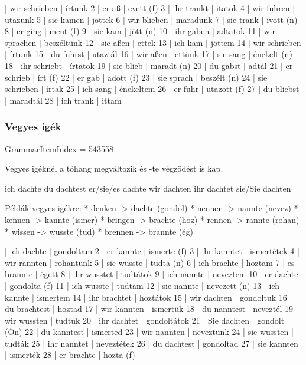 \documentclass{article}
\newenvironment{desc}{\verbatim}{\endverbatim}
\newenvironment{exmp}{\verbatim}{\endverbatim}
\begin{document}
\begin{exmp}
1 | wir schrieben | írtunk
2 | er aß | evett (f)
3 | ihr trankt | itatok
4 | wir fuhren | utazunk
5 | sie kamen | jöttek
6 | wir blieben | maradunk
7 | sie trank | ivott (n)
8 | er ging | ment (f)
9 | sie kam | jött (n)
10 | ihr gaben | adtatok
11 | wir sprachen | beszéltünk
12 | sie aßen | ettek
13 | ich kam | jöttem
14 | wir schrieben | írtunk
15 | du fuhrst | utaztál
16 | wir aßen | ettünk
17 | sie sang | énekelt (n)
18 | ihr schriebt | írtatok
19 | sie blieb | maradt (n)
20 | du gabst | adtál
21 | er schrieb | írt (f)
22 | er gab | adott (f)
23 | sie sprach | beszélt (n)
24 | sie schrieben | írtak
25 | ich sang | énekeltem
26 | er fuhr | utazott (f)
27 | du bliebst | maradtál
28 | ich trank | ittam
\end{exmp}

\subsubsection{Vegyes igék}

GrammarItemIndex = 543558

\begin{desc}
Vegyes igéknél a tőhang megváltozik és -te végződést is kap.

ich dachte
du dachtest
er/sie/es dachte
wir dachten
ihr dachtet
sie/Sie dachten

Példák vegyes igékre:
* denken -> dachte (gondol)
* nennen -> nannte (nevez)
* kennen -> kannte (ismer)
* bringen -> brachte (hoz)
* rennen -> rannte (rohan)
* wissen -> wusste (tud)
* brennen -> brannte (ég)
\end{desc}

\begin{exmp}
1 | ich dachte | gondoltam
2 | er kannte | ismerte (f)
3 | ihr kanntet | ismertétek
4 | wir rannten | rohantunk
5 | sie wusste | tudta (n)
6 | ich brachte | hoztam
7 | es brannte | égett
8 | ihr wusstet | tudtátok
9 | ich nannte | neveztem
10 | er dachte | gondolta (f)
11 | ich wusste | tudtam
12 | sie nannte | nevezett (n)
13 | ich kannte | ismertem
14 | ihr brachtet | hoztátok
15 | wir dachten | gondoltuk
16 | du brachtest | hoztad
17 | wir kannten | ismertük
18 | du nanntest | neveztél
19 | wir wussten | tudtuk
20 | ihr dachtet | gondoltátok
21 | Sie dachten | gondolt (Ön)
22 | du kanntest | ismerted
23 | wir nannten | neveztünk
24 | sie wussten | tudták
25 | ihr nanntet | neveztétek
26 | du dachtest | gondoltad
27 | sie kannten | ismerték
28 | er brachte | hozta (f)
\end{exmp}
\end{document}
